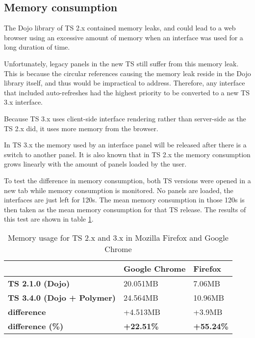 \documentclass[journal]{IEEEtran}
\begin{document}
\subsection{Memory consumption}
The Dojo library of TS 2.x contained memory leaks, and could lead to a web
browser using an excessive amount of memory when an interface was used for
a long duration of time.

Unfortunately, legacy
panels in the new TS still suffer from this memory leak. This is because the
circular references causing the memory leak reside in the Dojo library itself,
and thus would be impractical to address.
Therefore, any interface that included auto-refreshes had the highest priority
to be converted to a new TS 3.x interface.

Because TS 3.x uses client-side interface rendering rather than server-side as
the TS 2.x did, it uses more memory from the browser.

In TS 3.x the memory used
by an interface panel will be released after there is a switch to another panel.
It is also known that in TS 2.x the memory consumption grows linearly with the
amount of panels loaded by the user.

To test the difference in memory consumption, both TS versions were opened in
a new tab while memory consumption is monitored. No panels are loaded, the
interfaces are just left for 120s. The mean memory consumption in those 120s is
then taken as the mean memory consumption for that TS release.
The results of this test are shown in table \ref{tbl:memoryusage}.

\begin{table}
  \begin{center}
    \begin{tabular}{| l | l | l |}
    \hline
     & Google Chrome & Firefox \\ \hline
    \textbf{TS 2.1.0 (Dojo)} & 20.051MB & 7.06MB \\ \hline
    \textbf{TS 3.4.0 (Dojo + Polymer)} & 24.564MB & 10.96MB \\ \hline
    \textbf{difference} & +4.513MB & +3.9MB \\ \hline
    \textbf{difference (\%)} & \textbf{+22.51\%} & \textbf{+55.24\%} \\ \hline
    \end{tabular}
  \end{center}
  \caption{Memory usage for TS 2.x and 3.x in Mozilla Firefox and Google Chrome}
  \label{tbl:memoryusage}
\end{table}
\end{document}
